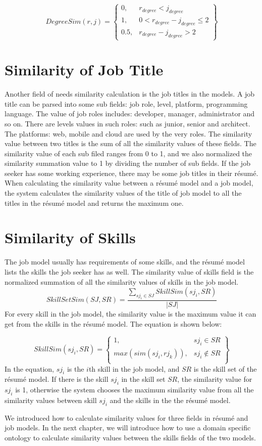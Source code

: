 $$ DegreeSim(r,j ) = \begin{Bmatrix}
0,   & r_{degree} < j_{degree} \\
1,   & 0 < r_{degree} - j_{degree} \leqslant 2  \\
0.5, & r_{degree} - j_{degree} > 2
\end{Bmatrix} $$

\section{Similarity of Job Title}
Another field of needs similarity calculation is the job titles in the models. A job title can be parsed into some sub fields: job role, level, platform, programming language.  The value of job roles includes: developer, manager, administrator and so on. There are levels values in such roles: such as junior, senior and architect. The platforms: web, mobile and cloud are used by the very roles.  The similarity value between two titles is the sum of all the similarity values of these fields. The similarity value of each sub filed ranges from 0 to 1, and we also normalized the similarity summation value to 1 by dividing the number of sub fields. If the job seeker has some working experience, there may be some job titles in their r\'esum\'e.  When calculating the similarity value between a r\'esum\'e model and a job model, the system calculates the similarity values of the title of job model to all the titles in the r\'esum\'e model and returns the maximum one.

\section{Similarity of Skills}

The job model usually has requirements of some skills, and the r\'esum\'e model lists the skills the job seeker has as well. The similarity value of skills field is the normalized summation of all the similarity values of skills in the job model. 
$$  SkillSetSim(SJ,SR) = \frac{ \sum_{sj_i \in SJ } SkillSim(sj_i,SR )} {|SJ|} $$
For every skill in the job model, the similarity value is the maximum value it can get from the skills in the r\'esum\'e model. The equation is shown below:



$$ SkillSim(sj_i,SR ) = \begin{Bmatrix}
1, & sj_i \in SR  \\
max( sim (sj_i, rj_k )), & sj_i \notin SR \\
\end{Bmatrix} $$
In the equation, $sj_i$ is the $i$th skill in the job model, and $SR$ is the skill set of the r\'esum\'e model. If there is the skill $sj_i$ in the skill set $SR$, the similarity value for $sj_i$ is 1, otherwise the system chooses the maximum similarity value from all the similarity values between skill $sj_i$ and the skills in the the r\'esum\'e model.

We introduced how to calculate similarity values for three fields in r\'esum\'e and job models. In the next chapter, we will introduce how to use a domain specific ontology to calculate similarity values between the skills fields of the two models.





